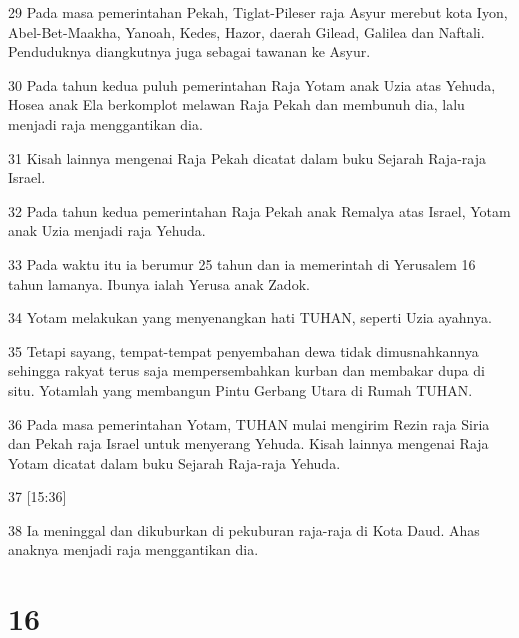 \par 29 Pada masa pemerintahan Pekah, Tiglat-Pileser raja Asyur merebut kota Iyon, Abel-Bet-Maakha, Yanoah, Kedes, Hazor, daerah Gilead, Galilea dan Naftali. Penduduknya diangkutnya juga sebagai tawanan ke Asyur.
\par 30 Pada tahun kedua puluh pemerintahan Raja Yotam anak Uzia atas Yehuda, Hosea anak Ela berkomplot melawan Raja Pekah dan membunuh dia, lalu menjadi raja menggantikan dia.
\par 31 Kisah lainnya mengenai Raja Pekah dicatat dalam buku Sejarah Raja-raja Israel.
\par 32 Pada tahun kedua pemerintahan Raja Pekah anak Remalya atas Israel, Yotam anak Uzia menjadi raja Yehuda.
\par 33 Pada waktu itu ia berumur 25 tahun dan ia memerintah di Yerusalem 16 tahun lamanya. Ibunya ialah Yerusa anak Zadok.
\par 34 Yotam melakukan yang menyenangkan hati TUHAN, seperti Uzia ayahnya.
\par 35 Tetapi sayang, tempat-tempat penyembahan dewa tidak dimusnahkannya sehingga rakyat terus saja mempersembahkan kurban dan membakar dupa di situ. Yotamlah yang membangun Pintu Gerbang Utara di Rumah TUHAN.
\par 36 Pada masa pemerintahan Yotam, TUHAN mulai mengirim Rezin raja Siria dan Pekah raja Israel untuk menyerang Yehuda. Kisah lainnya mengenai Raja Yotam dicatat dalam buku Sejarah Raja-raja Yehuda.
\par 37 [15:36]
\par 38 Ia meninggal dan dikuburkan di pekuburan raja-raja di Kota Daud. Ahas anaknya menjadi raja menggantikan dia.

\chapter{16}

